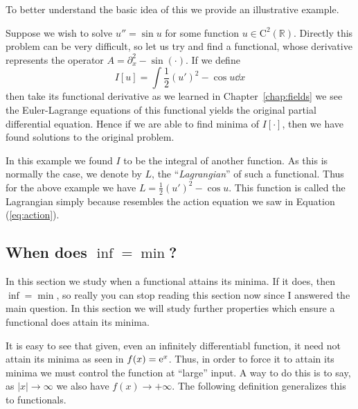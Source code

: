 To better understand the basic idea of this we provide an illustrative example.
\begin{example}
    Suppose we wish to solve \(u'' = \sin{u}\) for some function
    \(u\in\mathrm{C}^2(\mathbb{R})\). Directly this problem can be very
    difficult, so let us try and find a functional, whose derivative represents
    the operator \(A = \partial_x^2 - \sin(\cdot)\). If we define
    \begin{equation}
        I[u] = \int \frac{1}{2}(u')^2 - \cos{u}\dd{x}
    \end{equation}
    then take its functional derivative as we learned in
    Chapter~\ref{chap:fields} we see the Euler-Lagrange equations of this
    functional yields the original partial differential equation. Hence if we
    are able to find minima of \(I[\cdot]\), then we have found solutions to the
    original problem.
\end{example}
In this example we found \(I\) to be the integral of another function. As this
is normally the case, we denote by \(L\), the ``\textit{Lagrangian}'' of such a
functional. Thus for the above example we have \(L = \frac{1}{2}(u')^2 - \cos{u}\).
This function is called the Lagrangian simply because resembles the action
equation we saw in Equation (\ref{eq:action}).

\subsection{When does \texorpdfstring{\(\inf = \min\)}{inf = min}?}
In this section we study when a functional attains its minima. If it does, then
\(\inf = \min\), so really you can stop reading this section now since I
answered the main question. In this section we will study further properties
which ensure a functional does attain its minima.

It is easy to see that given, even an infinitely differentiabl function, it need
not attain its minima as seen in \(f(x) = \mathrm{e}^x\). Thus, in order to force it to
attain its minima we must control the function at ``large'' input. A way to do
this is to say, as \(|x|\to \infty\) we also have \(f(x)\to +\infty\). The
following definition generalizes this to functionals.

